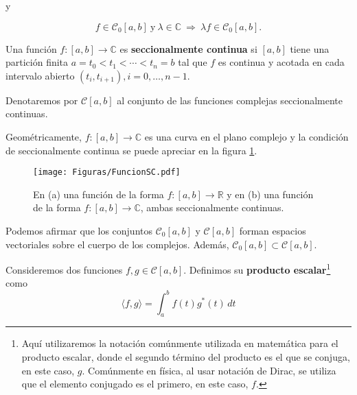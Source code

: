 y 
\begin{shaded}
$$f \in \mathscr{C}_0[a,b] ~\mbox{y}~ \lambda \in \mathbb{C} ~\Rightarrow~ \lambda f \in  \mathscr{C}_0[a,b].$$ 
\end{shaded}

\begin{defi}
Una función $f: [a,b] \longrightarrow \mathbb{C}$ es \textbf{seccionalmente continua} si $[a,b]$ tiene una partición finita $a = t_0 < t_1 < \cdots < t_n = b$ tal que $f$ es continua y acotada en cada intervalo abierto $(t_i, t_{i+1}), i = 0, \dots, n-1$.

Denotaremos por $\mathscr{C}[a,b]$ al conjunto de las funciones complejas seccionalmente continuas.
\end{defi}

Geométricamente, $f: [a,b] \longrightarrow \mathbb{C}$ es una curva en el plano complejo y la condición de seccionalmente continua se puede apreciar en la figura \ref{fig:FunciónSC}. 

\begin{figure}
    \centering
    \texttt{[image: Figuras/FuncionSC.pdf]}
    \caption{En (a) una función de la forma $f: [a,b] \rightarrow \mathbb{R}$ y en (b) una función de la forma $f: [a,b] \rightarrow \mathbb{C}$, ambas seccionalmente continuas.}
    \label{fig:FunciónSC}
\end{figure}

Podemos afirmar que los conjuntos $\mathscr{C}_0 [a,b]$ y $\mathscr{C}[a,b]$ forman espacios vectoriales sobre el cuerpo de los complejos. Además, $\mathscr{C}_0 [a,b] \subset \mathscr{C} [a,b].$

\begin{defi}
Consideremos dos funciones $f,g \in \mathscr{C}[a,b]$. Definimos su \textbf{producto escalar}\footnote{Aquí utilizaremos la notación comúnmente utilizada en matemática para el producto escalar, donde el segundo término del producto es el que se conjuga, en este caso, $g$. Comúnmente en física, al usar notación de Dirac, se utiliza que el elemento conjugado es el primero, en este caso, $f$.} como
$$\boxed{\langle f , g \rangle = \int_a^b f(t) g^\ast(t) \,dt }$$
\end{defi}

